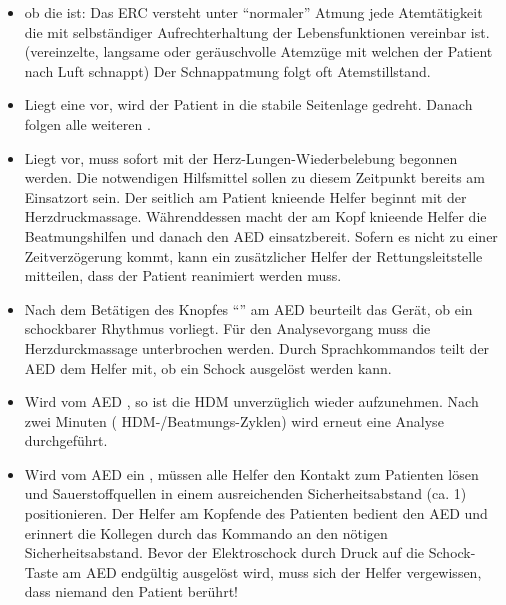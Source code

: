 {\begin{itemize}
  knapp über den Mund des Patienten gehalten. Die
  Blickrichtung des Helfers fällt auf den Brustkorb des
  Patienten. Jetzt wird für die Dauer von 10\Sec* die
  Atmung des Patienten beurteilt:
  \begin{itemize}
    \item {}: Bewegungen des Brustkorbs
    \item {}: Atemgeräusche
    \item {}: Luftstrom der Ausatemluft
    \end{itemize}
  \item {} ob die  ist: Das
  ERC versteht unter \enquote{normaler} Atmung jede
  Atemtätigkeit die mit selbständiger Aufrechterhaltung der
  Lebensfunktionen vereinbar ist. 
  (vereinzelte, langsame oder geräuschvolle Atemzüge mit
  welchen der Patient nach Luft schnappt)
   Der Schnappatmung folgt oft
  Atemstillstand.
  \item Liegt eine  vor, wird der Patient
  in die stabile Seitenlage gedreht. Danach folgen alle
  weiteren {\TxMassVit}.
  \item Liegt  vor, muss sofort mit
  der Herz-Lung\-en-Wied\-er\-be\-leb\-ung begonnen werden. Die
  notwendigen Hilfsmittel sollen zu diesem Zeitpunkt bereits
  am Einsatzort sein. Der seitlich am Patient knieende
  Helfer beginnt mit der 
  Herzdruckmassage. Währenddessen macht der am Kopf
  knieende Helfer die Beatmungshilfen und danach den AED
  einsatzbereit. Sofern es nicht zu einer
  Zeitverzögerung kommt, kann ein zusätzlicher Helfer der 
  Rettungsleitstelle mitteilen, dass der Patient
  reanimiert werden muss.
  \item Nach dem Betätigen des Knopfes
  \enquote{} am AED beurteilt das Gerät, ob
  ein schockbarer Rhythmus vorliegt. Für den
  Analysevorgang muss die Herzdurckmassage unterbrochen werden. 
  Durch
  Sprachkommandos teilt der AED dem Helfer mit, ob ein Schock
  ausgelöst werden kann.
  \item Wird vom AED , so ist die
  HDM unverzüglich wieder aufzunehmen. Nach zwei Minuten
  ( HDM-/Beatmungs-Zyklen) wird erneut eine Analyse
  durchgeführt.
  \item Wird vom AED ein , müssen alle
  Helfer den Kontakt zum Patienten lösen und Sauerstoffquellen 
  in einem ausreichenden Sicherheitsabstand (ca. 1\Meter*) positionieren. 
  Der Helfer am
  Kopfende des Patienten bedient den AED und erinnert die
  Kollegen durch das  Kommando
   an den nötigen Sicherheitsabstand. Bevor  der
  Elektroschock durch Druck auf die Schock-Taste am AED
  endgültig ausgelöst wird, muss sich der Helfer
  vergewissen, dass niemand den Patient berührt!


\end{itemize}}
